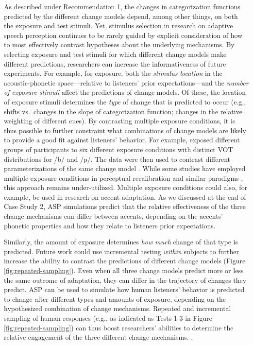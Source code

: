 \documentclass[
  11pt,
  man,floatsintext]{apa6}
\begin{document}
As described under Recommendation 1, the changes in categorization functions predicted by the different change models depend, among other things, on both the exposure and test stimuli. Yet, stimulus selection in research on adaptive speech perception continues to be rarely guided by explicit consideration of how to most effectively contrast hypotheses about the underlying mechanisms. By selecting exposure and test stimuli for which different change models make different predictions, researchers can increase the informativeness of future experiments. For example, for exposure, both the \emph{stimulus location} in the acoustic-phonetic space---relative to listeners' prior expectations---and the \emph{number of exposure stimuli} affect the predictions of change models. Of these, the location of exposure stimuli determines the \emph{type} of change that is predicted to occur (e.g., shifts vs.~changes in the slope of categorization function; changes in the relative weighting of different cues). By contrasting multiple exposure conditions, it is thus possible to further constraint what combinations of change models are likely to provide a good fit against listeners' behavior. For example, \textcite{kleinschmidt-jaeger2016cogsci} exposed different groups of participants to six different exposure conditions with distinct VOT distributions for /b/ and /p/. The data were then used to contrast different parameterizations of the same change model \autocite[for additional analyses and discussion, see also][]{kleinschmidt2020}. While some studies have employed multiple exposure conditions in perceptual recalibration and similar paradigms \autocites[e.g.,][]{babel2019,sumner2011}, this approach remains under-utilized. Multiple exposure conditions could also, for example, be used in research on accent adaptation. As we discussed at the end of Case Study 2, ASP simulations predict that the relative effectiveness of the three change mechanisms can differ between accents, depending on the accents' phonetic properties and how they relate to listeners prior expectations.

Similarly, the amount of exposure determines \emph{how much} change of that type is predicted.
Future work could use incremental testing \emph{within} subjects to further increase the ability to contrast the predictions of different change models (Figure \ref{fig:repeated-sampling}). Even when all three change models predict more or less the same outcome of adaptation, they can differ in the trajectory of changes they predict. ASP can be used to simulate how human listeners' behavior is predicted to change after different types and amounts of exposure, depending on the hypothesized combination of change mechanisms. Repeated and incremental sampling of human responses (e.g., as indicated as Tests 1-3 in Figure \ref{fig:repeated-sampling}) can thus boost researchers' abilities to determine the relative engagement of the three different change mechanisms. .
\end{document}
